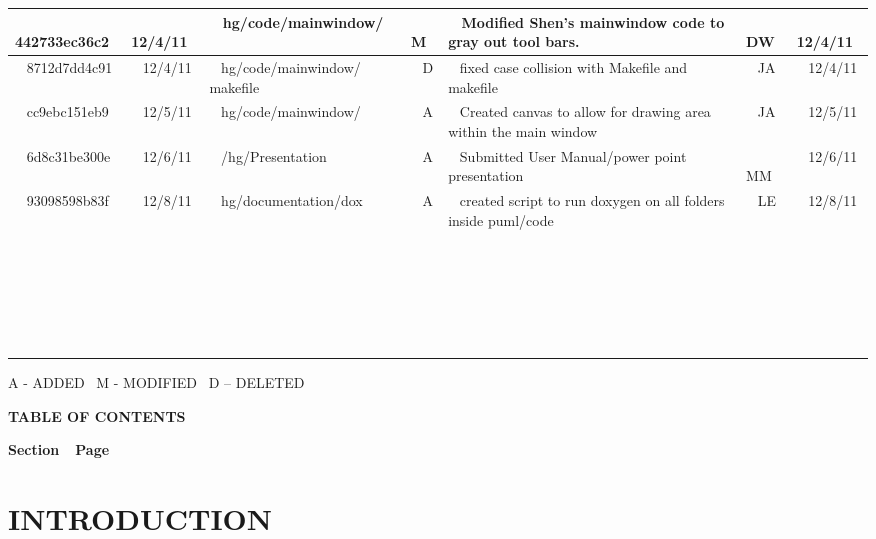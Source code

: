 \documentclass[twoside,letterpaper]{article}
\begin{document}
\begin{flushleft}
\begin{supertabular}{|m{1.0in}|m{0.6in}|p{1.5in}|m{.25in}|m{2.0in}|m{.7in}|m{0.65in}|}
\\\hline
~
442733ec36c2 &
~
12/4/11 &
~
hg/code/mainwindow/  &
~
M &
~
Modified Shen's mainwindow code to gray out tool bars. &
~
DW &
~
12/4/11


\\\hline
~
8712d7dd4c91 &
~
12/4/11 &
~
hg/code/mainwindow/ makefile &
~
D &
~
fixed case collision with Makefile and makefile &
~
JA &
~
12/4/11


\\\hline
~
cc9ebc151eb9 &
~
12/5/11 &
~
hg/code/mainwindow/ &
~
A &
~
Created canvas to allow for drawing area within the main window &
~
JA &
~
12/5/11



\\\hline
~
6d8c31be300e &
~
12/6/11 &
~
/hg/Presentation &
~
A &
~
Submitted User Manual/power point presentation &
~
MM &
~
12/6/11


\\\hline
~
93098598b83f &
~
12/8/11 &
~
hg/documentation/dox &
~
A &
~
created script to run doxygen on all folders inside puml/code &
~
LE &
~
12/8/11

\\\hline
~
 &
~
 &
~
 &
~
 &
~
 &
~
 &
~
\\\hline
~
 &
~
 &
~
 &
~
 &
~
 &
~
 &
~
\\\hline
~
 &
~
 &
~
 &
~
 &
~
 &
~
 &
~
\\\hline
~
 &
~
 &
~
 &
~
 &
~
 &
~
 &
~
\\\hline
~
 &
~
 &
~
 &
~
 &
~
 &
~
 &
~
\\\hline
\end{supertabular}
\end{flushleft}
{\color{black}
A - ADDED \ M - MODIFIED \ D -- DELETED}


{\centering{}\bfseries\color{black}
TABLE OF CONTENTS
\par}

{\bfseries\color{black}
Section\ \ Page}

\setcounter{tocdepth}{9}
\renewcommand\contentsname{}
\tableofcontents

\bigskip

\bigskip
\clearpage\setcounter{page}{1}\pagestyle{Convertiv}
\section[INTRODUCTION]{\bfseries\color{black}
INTRODUCTION}
\end{document}
